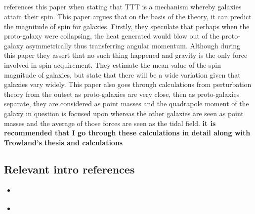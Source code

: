 \documentclass[fleqn,usenatbib]{mnras}
\begin{document}
\subsection{\citet{Peebles_69}}
\citet{Trowland_13} references this paper when stating that TTT is a mechanism whereby galaxies attain their spin.
This paper argues that on the basis of the theory, it can predict the magnitude of spin for galaxies.
Firstly, they speculate that perhaps when the proto-galaxy were collapsing, the heat generated would blow out of the proto-galaxy asymmetrically thus transferring angular momentum. Although during this paper they assert that no such thing happened and gravity is the only force involved in spin acquirement. 
They estimate the mean value of the spin magnitude of galaxies, but state that there will be a wide variation given that galaxies vary widely. 
This paper also goes through calculations from perturbation theory from the outset as proto-galaxies are very close, then as proto-galaxies separate, they are considered as point masses and the quadrapole moment of the galaxy in question is focused upon whereas the other galaxies are seen as point masses and the average of those forces are seen as the tidal field. \textbf{it is recommended that I go through these calculations in detail along with Trowland's thesis and \citet{Shafer_09} calculations} 

\subsection{\citet{Vitvitska02}}
\subsection{Relevant intro references}
\begin{itemize}
\item \citet{Sugerman_00}
\item \citet{Porciani_02}
\end{itemize}
\end{document}
